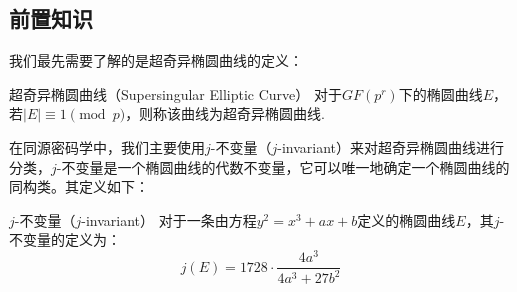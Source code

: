 \documentclass{book}
\numberwithin{equation}{subsubsection}
\begin{document}
\subsection{前置知识\cite{24, 25, 26}}
我们最先需要了解的是超奇异椭圆曲线的定义：

\begin{concept}{超奇异椭圆曲线（Supersingular Elliptic Curve）}
    对于$GF(p^r)$下的椭圆曲线$E$，若$|E|\equiv 1\pmod{p}$，则称该曲线为超奇异椭圆曲线.
\end{concept}

在同源密码学中，我们主要使用$j$-不变量（$j$-invariant）来对超奇异椭圆曲线进行分类，$j$-不变量是一个椭圆曲线的代数不变量，它可以唯一地确定一个椭圆曲线的同构类。其定义如下：

\begin{concept}{$j$-不变量（$j$-invariant）}
    对于一条由方程$y^2=x^3+ax+b$定义的椭圆曲线$E$，其$j$-不变量的定义为：
    \begin{equation}
        j(E)=1728\cdot\frac{4a^3}{4a^3+27b^2}
        \nonumber
    \end{equation}
\end{concept}
\end{document}
